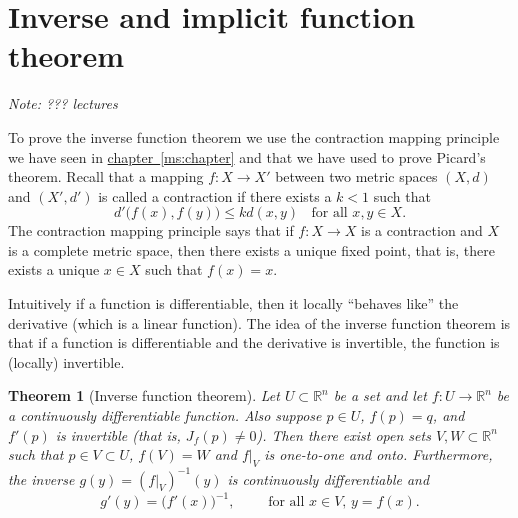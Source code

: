 \documentclass[12pt]{book}
\newcommand{\R}{{\mathbb{R}}}
\newcommand{\sectionnotes}[1]{\noindent \emph{Note: #1} \medskip \par}
\newcommand{\sectionnewpage}{\clearpage}
\theoremstyle{plain}
\newtheorem{thm}{Theorem}[section]
\theoremstyle{remark}
\theoremstyle{definition}
\theoremstyle{exercise}
\theoremstyle{example}
\newcommand{\chapterref}[1]{\hyperref[#1]{chapter~\ref*{#1}}}
\begin{document}

\sectionnewpage
\section{Inverse and implicit function theorem}
\label{sec:svinvfuncthm}

\sectionnotes{??? lectures}

To prove the inverse function theorem we use the contraction mapping
principle we have seen in \chapterref{ms:chapter} and that we have used
to prove Picard's theorem.
Recall that a mapping $f \colon X \to X'$ between two metric
spaces $(X,d)$ and $(X',d')$ is called a contraction 
if there exists a $k < 1$ such that
\begin{equation*}
d'\bigl(f(x),f(y)\bigr) \leq k d(x,y)
\ \ \ \ \text{for all } x,y \in X.
\end{equation*}
The contraction mapping principle says that if $f \colon X \to X$
is a contraction and $X$ is a complete metric space,
then there exists a unique fixed point, that is,
there exists a unique $x \in X$ such that $f(x) = x$.

Intuitively if a function is differentiable, then it
locally ``behaves like'' the derivative (which is a linear function).
The idea of the inverse function theorem is that if a function is
differentiable and the derivative is invertible, the function is
(locally) invertible.


\begin{thm}[Inverse function theorem]
Let $U \subset \R^n$ be a set and let
$f \colon U \to \R^n$ be a continuously differentiable function.
Also suppose $p \in U$, $f(p) = q$, and $f'(p)$ is invertible
(that is, $J_f(p) \not=0$).
Then there exist open sets $V, W \subset \R^n$ such that
$p \in V \subset U$, $f(V) = W$ and $f|_V$ is one-to-one and onto.  
Furthermore, the inverse $g(y) = (f|_V)^{-1}(y)$ is continuously differentiable
and 
\begin{equation*}
g'(y) = {\bigl(f'(x)\bigr)}^{-1}, \qquad \text{ for all $x \in V$, $y = f(x)$.}
\end{equation*}
\end{thm}
\end{document}
